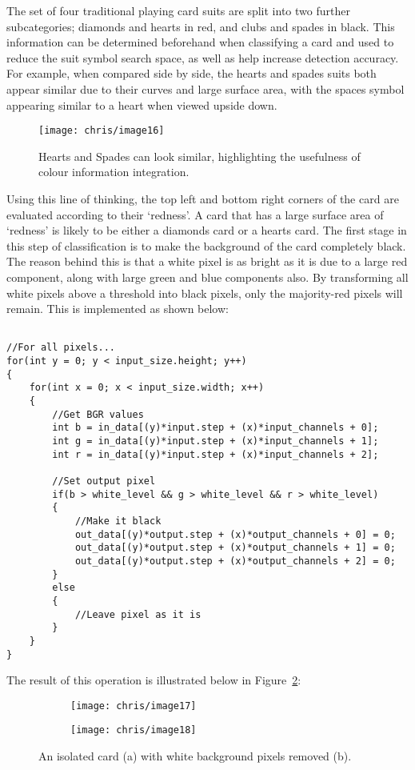 		The set of four traditional playing card suits are split into two further subcategories; diamonds and hearts in red, and clubs and spades in black. This information can be determined beforehand when classifying a card and used to reduce the suit symbol search space, as well as help increase detection accuracy. For example, when compared side by side, the hearts and spades suits both appear similar due to their curves and large surface area, with the spaces symbol appearing similar to a heart when viewed upside down.

		\begin{figure}[H]
			\centering
			\texttt{[image: chris/image16]}
			\caption{Hearts and Spades can look similar, highlighting the usefulness of colour information integration.}
			\label{fig:colours}
		\end{figure}

		Using this line of thinking, the top left and bottom right corners of the card are evaluated according to their `redness'. A card that has a large surface area of `redness' is likely to be either a diamonds card or a hearts card. The first stage in this step of classification is to make the background of the card completely black. The reason behind this is that a white pixel is as bright as it is due to a large red component, along with large green and blue components also. By transforming all white pixels above a threshold into black pixels, only the majority-red pixels will remain. This is implemented as shown below:
		
		\begin{lstlisting}

//For all pixels...
for(int y = 0; y < input_size.height; y++)
{
	for(int x = 0; x < input_size.width; x++)
	{
		//Get BGR values
		int b = in_data[(y)*input.step + (x)*input_channels + 0];
		int g = in_data[(y)*input.step + (x)*input_channels + 1];
		int r = in_data[(y)*input.step + (x)*input_channels + 2];

		//Set output pixel
		if(b > white_level && g > white_level && r > white_level)
		{
			//Make it black
			out_data[(y)*output.step + (x)*output_channels + 0] = 0;
			out_data[(y)*output.step + (x)*output_channels + 1] = 0;
			out_data[(y)*output.step + (x)*output_channels + 2] = 0;
		}
		else
		{
			//Leave pixel as it is
		}
	}
}
		\end{lstlisting}

		The result of this operation is illustrated below in Figure~\ref{fig:whitebg}:
		\begin{figure}[H]
			\centering
			\begin{subfigure}[b]{0.4\textwidth}
				\centering
				\texttt{[image: chris/image17]}
				\caption{}
			\end{subfigure}
			\begin{subfigure}[b]{0.4\textwidth}
				\centering
				\texttt{[image: chris/image18]}
				\caption{}
			\end{subfigure}
			\caption{An isolated card (a) with white background pixels removed (b).}
			\label{fig:whitebg}
		\end{figure}


